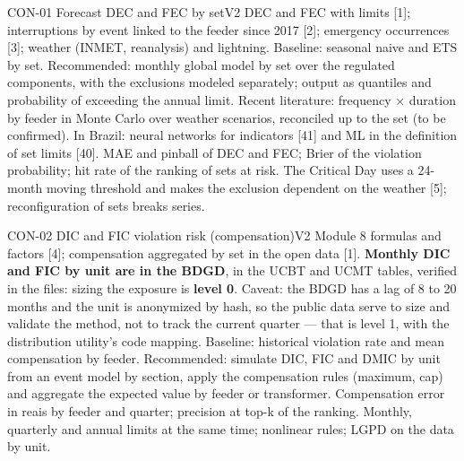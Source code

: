 \begin{ficha}{CON-01 \textperiodcentered{} Forecast DEC and FEC by set}{V2}
 DEC and FEC with limits [1]; interruptions by event linked to the
feeder since 2017 [2]; emergency occurrences [3]; weather (INMET,
reanalysis) and lightning.
 Baseline: seasonal naive and ETS by set.
Recommended: monthly global model by set over the regulated components,
with the exclusions modeled separately; output as quantiles and probability of
exceeding the annual limit. Recent literature: frequency × duration by feeder
in Monte Carlo over weather scenarios, reconciled up to the set (to be
confirmed). In Brazil: neural networks for indicators [41] and ML in the
definition of set limits [40].
 MAE and pinball of DEC and FEC; Brier of the violation
probability; hit rate of the ranking of sets at risk.
 The Critical Day uses a 24-month moving threshold and makes
the exclusion dependent on the weather [5]; reconfiguration of sets breaks
series.
\end{ficha}

\begin{ficha}{CON-02 \textperiodcentered{} DIC and FIC violation risk (compensation)}{V2}
 Module 8 formulas and factors [4]; compensation aggregated by
set in the open data [1]. \textbf{Monthly DIC and FIC by unit are
in the BDGD}, in the UCBT and UCMT tables, verified in the files: sizing the
exposure is \textbf{level 0}. Caveat: the BDGD has a lag of 8 to 20 months and
the unit is anonymized by hash, so the public data serve to size
and validate the method, not to track the current quarter --- that is
level 1, with the distribution utility's code mapping.
 Baseline: historical violation rate and mean
compensation by feeder. Recommended: simulate DIC, FIC and DMIC by unit
from an event model by section, apply the compensation rules
(maximum, cap) and aggregate the expected value by feeder or transformer.
 Compensation error in reais by feeder and quarter;
precision at top-k of the ranking.
 Monthly, quarterly and annual limits at the same time;
nonlinear rules; LGPD on the data by unit.
\end{ficha}

